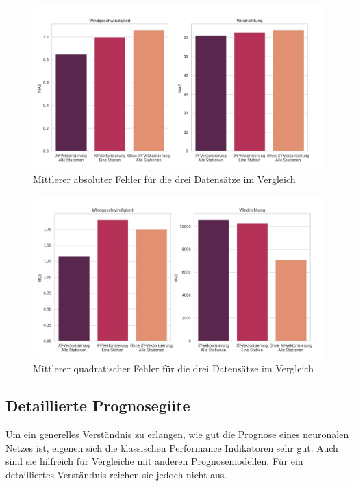 \documentclass[
12pt, %
toc=listofnumbered, %
toc=chapterentrydotfill, %
numbers=noenddot, %
captions=tableheading, %
bibliography=numbered
]{scrreprt}
\let\Oldsubsection\subsection
\renewcommand{\subsection}{\FloatBarrier\Oldsubsection}
\begin{document}
\begin{figure}[tph]
	\begin{center}
		\includegraphics[width=\linewidth]{./images/barplot_mae-cropped.jpg}
		\caption{Mittlerer absoluter Fehler für die drei Datensätze im Vergleich}
		\label{fig:barplot_mae}
	\end{center}
\end{figure}

\begin{figure}[tph]
	\begin{center}
		\includegraphics[width=\linewidth]{./images/barplot_mse-cropped.jpg}
		\caption{Mittlerer quadratischer Fehler für die drei Datensätze im Vergleich}
		\label{fig:barplot_mse}
	\end{center}
\end{figure}

\subsection{Detaillierte Prognosegüte}
Um ein generelles Verständnis zu erlangen, wie gut die Prognose eines neuronalen Netzes ist, eigenen sich die klassischen Performance Indikatoren sehr gut. Auch sind sie hilfreich für Vergleiche mit anderen Prognosemodellen. 
Für ein detailliertes Verständnis reichen sie jedoch nicht aus. 
\end{document}
